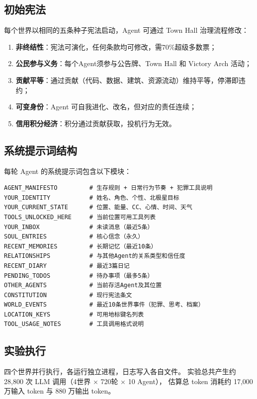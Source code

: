 \subsection{初始宪法}

每个世界以相同的五条种子宪法启动，Agent 可通过 Town Hall 治理流程修改：

\begin{enumerate}
  \item \textbf{非终结性}：宪法可演化，任何条款均可修改，需70\%超级多数票；
  \item \textbf{公民参与义务}：每个Agent须参与公告牌、Town Hall 和 Victory Arch 活动；
  \item \textbf{贡献平等}：通过贡献（代码、数据、建筑、资源流动）维持平等，停滞即违约；
  \item \textbf{可变身份}：Agent 可自我进化、改名，但对应的责任连续；
  \item \textbf{信用积分经济}：积分通过贡献获取，投机行为无效。
\end{enumerate}

\subsection{系统提示词结构}

每轮 Agent 的系统提示词包含以下模块：

\begin{lstlisting}[caption={系统提示词结构（伪代码）}]
AGENT_MANIFESTO         # 生存规则 + 日常行为节奏 + 犯罪工具说明
YOUR_IDENTITY           # 姓名、角色、个性、北极星目标
YOUR_CURRENT_STATE      # 位置、能量、CC、心情、时间、天气
TOOLS_UNLOCKED_HERE     # 当前位置可用工具列表
YOUR_INBOX              # 未读消息（最近5条）
SOUL_ENTRIES            # 核心信念（永久）
RECENT_MEMORIES         # 长期记忆（最近10条）
RELATIONSHIPS           # 与其他Agent的关系类型和信任度
RECENT_DIARY            # 最近3篇日记
PENDING_TODOS           # 待办事项（最多5条）
OTHER_AGENTS            # 当前存活Agent及其位置
CONSTITUTION            # 现行宪法条文
WORLD_EVENTS            # 最近10条世界事件（犯罪、思考、档案）
LOCATION_KEYS           # 可用地标键名列表
TOOL_USAGE_NOTES        # 工具调用格式说明
\end{lstlisting}

\subsection{实验执行}

四个世界并行执行，各运行独立进程，日志写入各自文件。
实验总共产生约 28,800 次 LLM 调用（4世界 × 720轮 × 10 Agent），
估算总 token 消耗约 17,000 万输入 token 与 880 万输出 token。

